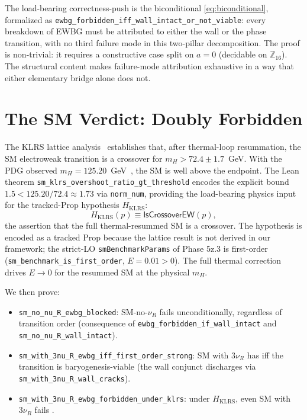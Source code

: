 \documentclass[aps,prl,twocolumn,showpacs,superscriptaddress,nofootinbib]{revtex4-2}
\newcommand{\EWBGViable}{\mathsf{EWBGViable}}
\newcommand{\Zsixteen}{\mathbb{Z}_{16}}
\begin{document}
The load-bearing correctness-push is the biconditional
\eqref{eq:biconditional}, formalized as
\texttt{ewbg\_forbidden\_iff\_wall\_intact\_or\_not\_viable}: every
breakdown of EWBG must be attributed to either the wall or the phase
transition, with no third failure mode in this two-pillar
decomposition. The proof is non-trivial: it requires a constructive
case split on $a = 0$ (decidable on $\Zsixteen$). The structural
content makes failure-mode attribution exhaustive in a way that
either elementary bridge alone does not.

\section{The SM Verdict: Doubly Forbidden}
\label{sec:sm-verdict}

The KLRS lattice analysis~\cite{KLRS1996,CsikorFodorHeitger1999}
establishes that, after thermal-loop resummation, the SM electroweak
transition is a crossover for $m_H > 72.4 \pm 1.7$~GeV. With the PDG
observed $m_H = 125.20$~GeV~\cite{PDG2024}, the SM is well above the
endpoint. The Lean theorem
\texttt{sm\_klrs\_overshoot\_ratio\_gt\_threshold}
encodes the explicit bound $1.5 < 125.20 / 72.4 \approx 1.73$ via
\texttt{norm\_num}, providing the load-bearing physics input for the
tracked-Prop hypothesis $H_\mathrm{KLRS}$:
\begin{equation}
H_\mathrm{KLRS}(p) \equiv \mathsf{IsCrossoverEW}(p),
\end{equation}
the assertion that the full thermal-resummed SM is a crossover. The
hypothesis is encoded as a tracked Prop because the lattice result is
not derived in our framework; the strict-LO
\texttt{smBenchmarkParams} of Phase 5z.3 is first-order
(\texttt{sm\_benchmark\_is\_first\_order}, $E = 0.01 > 0$). The full
thermal correction drives $E \to 0$ for the resummed SM at the
physical $m_H$.

We then prove:
\begin{itemize}
\item \texttt{sm\_no\_nu\_R\_ewbg\_blocked}: SM-no-$\nu_R$ fails
\EWBGViable{} unconditionally, regardless of transition order
(consequence of \texttt{ewbg\_forbidden\_if\_wall\_intact} and
\texttt{sm\_no\_nu\_R\_wall\_intact}).
\item \texttt{sm\_with\_3nu\_R\_ewbg\_iff\_first\_order\_strong}:
SM with $3\nu_R$ has \EWBGViable{} iff the transition is
baryogenesis-viable (the wall conjunct discharges via
\texttt{sm\_with\_3nu\_R\_wall\_cracks}).
\item \texttt{sm\_with\_3nu\_R\_ewbg\_forbidden\_under\_klrs}: under
$H_\mathrm{KLRS}$, even SM with $3\nu_R$ fails \EWBGViable{}.
\end{itemize}
\end{document}
